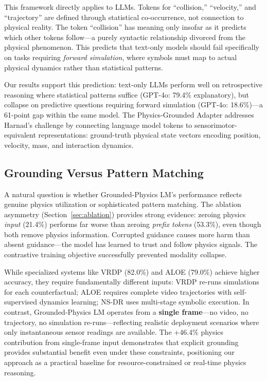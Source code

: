 \documentclass[conference]{IEEEtran}
\theoremstyle{plain}
\theoremstyle{definition}
\theoremstyle{remark}
\begin{document}
This framework directly applies to LLMs. Tokens for ``collision,'' ``velocity,'' and ``trajectory'' are defined through statistical co-occurrence, not connection to physical reality. The token ``collision'' has meaning only insofar as it predicts which other tokens follow---a purely syntactic relationship divorced from the physical phenomenon. This predicts that text-only models should fail specifically on tasks requiring \emph{forward simulation}, where symbols must map to actual physical dynamics rather than statistical patterns.

Our results support this prediction: text-only LLMs perform well on retrospective reasoning where statistical patterns suffice (GPT-4o: 79.4\% explanatory), but collapse on predictive questions requiring forward simulation (GPT-4o: 18.6\%)---a 61-point gap within the same model. The Physics-Grounded Adapter addresses Harnad's challenge by connecting language model tokens to sensorimotor-equivalent representations: ground-truth physical state vectors encoding position, velocity, mass, and interaction dynamics.

\subsection{Grounding Versus Pattern Matching}

A natural question is whether Grounded-Physics LM's performance reflects genuine physics utilization or sophisticated pattern matching. The ablation asymmetry (Section~\ref{sec:ablation}) provides strong evidence: zeroing physics \emph{input} (21.4\%) performs far worse than zeroing \emph{prefix tokens} (53.3\%), even though both remove physics information. Corrupted guidance causes more harm than absent guidance---the model has learned to trust and follow physics signals. The contrastive training objective successfully prevented modality collapse.

While specialized systems like VRDP \cite{ding2021vrdp} (82.0\%) and ALOE \cite{ding2021aloe} (79.0\%) achieve higher accuracy, they require fundamentally different inputs: VRDP re-runs simulations for each counterfactual; ALOE requires complete video trajectories with self-supervised dynamics learning; NS-DR \cite{yi2020clevrer} uses multi-stage symbolic execution. In contrast, Grounded-Physics LM operates from a \textbf{single frame}---no video, no trajectory, no simulation re-runs---reflecting realistic deployment scenarios where only instantaneous sensor readings are available. The +46.4\% physics contribution from single-frame input demonstrates that explicit grounding provides substantial benefit even under these constraints, positioning our approach as a practical baseline for resource-constrained or real-time physics reasoning.
\end{document}
